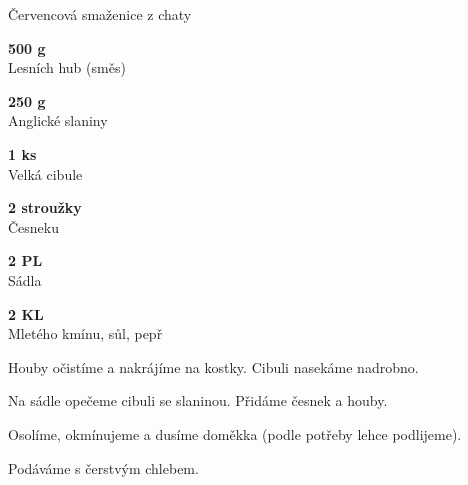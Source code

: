\documentclass[11pt,a4paper]{article}
\begin{document}

\begin{recipe}[ForestGreen]{Červencová smaženice z chaty }
    \begin{ingredients}
        \item \parbox[t]{\linewidth}{\raggedright \weight \textbf{500 g}\\ Lesních hub (směs)}
        \item \parbox[t]{\linewidth}{\raggedright \weight \textbf{250 g}\\ Anglické slaniny}
        \item \parbox[t]{\linewidth}{\raggedright \piece \textbf{1 ks}\\ Velká cibule}
        \item \parbox[t]{\linewidth}{\raggedright \piece \textbf{2 stroužky}\\ Česneku}
        \item \parbox[t]{\linewidth}{\raggedright \spoon \textbf{2 PL}\\ Sádla}
        \item \parbox[t]{\linewidth}{\raggedright \indefinite \textbf{2 KL}\\ Mletého kmínu, sůl, pepř}
    \end{ingredients}
    \begin{steps}
        \item Houby očistíme a nakrájíme na kostky. Cibuli nasekáme nadrobno.
        \item Na sádle opečeme cibuli se slaninou. Přidáme česnek a houby.
        \item Osolíme, okmínujeme a dusíme doměkka (podle potřeby lehce podlijeme).
        \item Podáváme s čerstvým chlebem.
    \end{steps}
\end{recipe}
\end{document}
